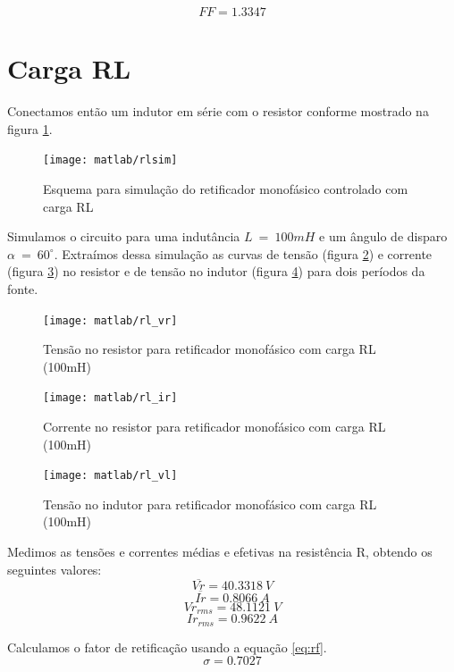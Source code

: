 \documentclass{article}
\begin{document}
\begin{equation}
FF = 1.3347
\end{equation}


\section{Carga RL}
Conectamos então um indutor em série com o resistor conforme mostrado na figura \ref{fig:rlsim}.
\begin{figure}[H]
	\centering
	\texttt{[image: matlab/rlsim]}
	\caption{Esquema para simulação do retificador monofásico controlado com carga RL}
	\label{fig:rlsim}
\end{figure}

Simulamos o circuito para uma indutância $L\ =\ 100mH$ e um ângulo de disparo $\alpha\ =\ 60^\circ$. Extraímos dessa simulação as curvas de tensão (figura \ref{fig:rlvr}) e corrente (figura \ref{fig:rlir}) no resistor e de tensão no indutor (figura \ref{fig:rlvl}) para dois períodos da fonte.
\begin{figure}[H]
	\centering
	\texttt{[image: matlab/rl\_vr]}
	\caption{Tensão no resistor para retificador monofásico com carga RL (100mH)}
	\label{fig:rlvr}
\end{figure}
\begin{figure}[H]
	\centering
	\texttt{[image: matlab/rl\_ir]}
	\caption{Corrente no resistor para retificador monofásico com carga RL (100mH)}
	\label{fig:rlir}
\end{figure}
\begin{figure}[H]
	\centering
	\texttt{[image: matlab/rl\_vl]}
	\caption{Tensão no indutor para retificador monofásico com carga RL (100mH)}
	\label{fig:rlvl}
\end{figure}
Medimos as tensões e correntes médias e efetivas na resistência R, obtendo os seguintes valores:
\begin{equation}
\overline{Vr} = 40.3318\ V
\end{equation}
\begin{equation}
\overline{Ir} =  0.8066\ A
\end{equation}
\begin{equation}
Vr_{rms} =  48.1121\ V
\end{equation}
\begin{equation}
Ir_{rms} =   0.9622\ A
\end{equation}

Calculamos o fator de retificação usando a equação \ref{eq:rf}.
\begin{equation}
\sigma = 0.7027
\end{equation}
\end{document}
